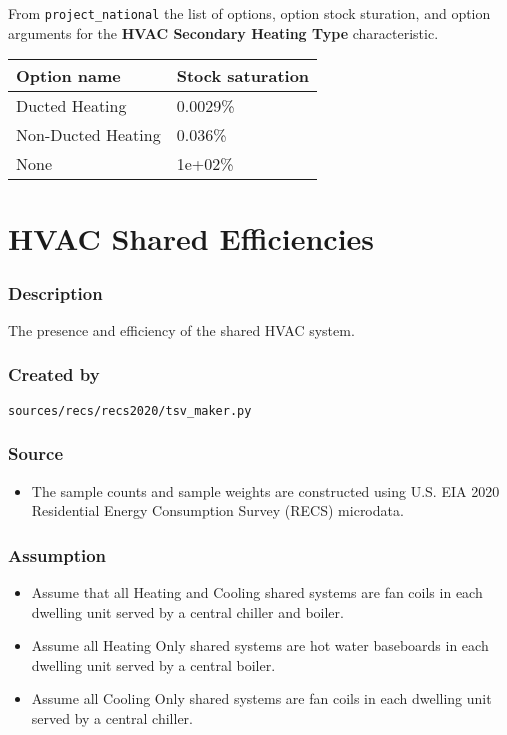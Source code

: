 From \texttt{project\_national} the list of options, option stock
sturation, and option arguments for the \textbf{HVAC Secondary Heating
Type} characteristic.

\begin{longtable}[]{@{}ll@{}}
\toprule\noalign{}
Option name & Stock saturation \\
\midrule\noalign{}
\endhead
\bottomrule\noalign{}
\endlastfoot
Ducted Heating & 0.0029\% \\
Non-Ducted Heating & 0.036\% \\
None & 1e+02\% \\
\end{longtable}

\section{HVAC Shared Efficiencies}\label{hvac_shared_efficiencies}

\subsubsection{Description}\label{description-78}

The presence and efficiency of the shared HVAC system.

\subsubsection{Created by}\label{created-by-78}

\texttt{sources/recs/recs2020/tsv\_maker.py}

\subsubsection{Source}\label{source-77}

\begin{itemize}
 
\item
  The sample counts and sample weights are constructed using U.S. EIA
  2020 Residential Energy Consumption Survey (RECS) microdata.
\end{itemize}

\subsubsection{Assumption}\label{assumption-48}

\begin{itemize}
 
\item
  Assume that all Heating and Cooling shared systems are fan coils in
  each dwelling unit served by a central chiller and boiler.
\item
  Assume all Heating Only shared systems are hot water baseboards in
  each dwelling unit served by a central boiler.
\item
  Assume all Cooling Only shared systems are fan coils in each dwelling
  unit served by a central chiller.
\end{itemize}

